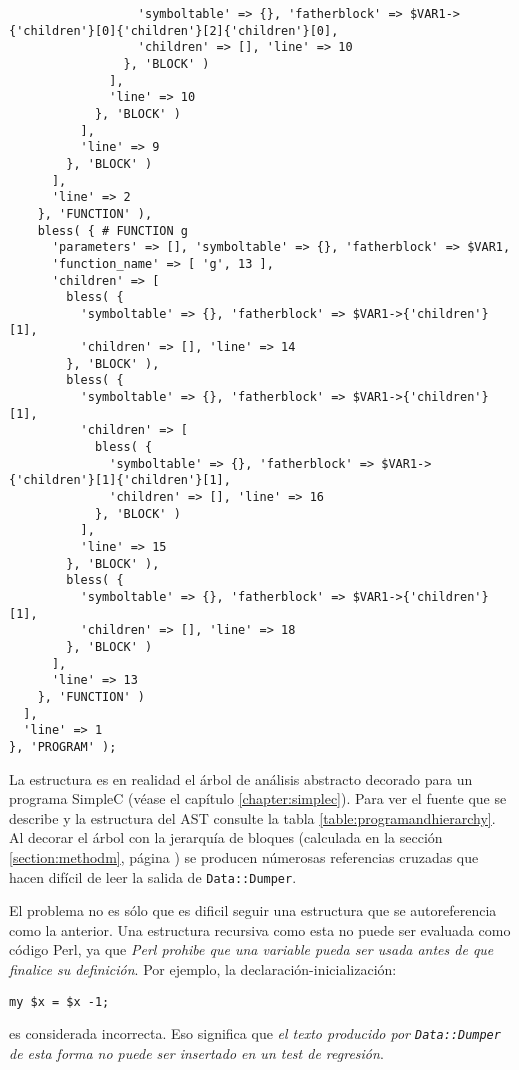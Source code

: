 \begin{verbatim}
                  'symboltable' => {}, 'fatherblock' => $VAR1->{'children'}[0]{'children'}[2]{'children'}[0],
                  'children' => [], 'line' => 10
                }, 'BLOCK' )
              ],
              'line' => 10
            }, 'BLOCK' )
          ],
          'line' => 9
        }, 'BLOCK' )
      ],
      'line' => 2
    }, 'FUNCTION' ),
    bless( { # FUNCTION g
      'parameters' => [], 'symboltable' => {}, 'fatherblock' => $VAR1,
      'function_name' => [ 'g', 13 ],
      'children' => [
        bless( {
          'symboltable' => {}, 'fatherblock' => $VAR1->{'children'}[1],
          'children' => [], 'line' => 14
        }, 'BLOCK' ),
        bless( {
          'symboltable' => {}, 'fatherblock' => $VAR1->{'children'}[1],
          'children' => [
            bless( {
              'symboltable' => {}, 'fatherblock' => $VAR1->{'children'}[1]{'children'}[1],
              'children' => [], 'line' => 16
            }, 'BLOCK' )
          ],
          'line' => 15
        }, 'BLOCK' ),
        bless( {
          'symboltable' => {}, 'fatherblock' => $VAR1->{'children'}[1],
          'children' => [], 'line' => 18
        }, 'BLOCK' )
      ],
      'line' => 13
    }, 'FUNCTION' )
  ],
  'line' => 1
}, 'PROGRAM' );
\end{verbatim}
La estructura es en realidad el árbol de análisis abstracto decorado
para un programa SimpleC
(véase el capítulo \ref{chapter:simplec}).
Para ver el fuente que se describe y la estructura del AST
consulte la tabla \ref{table:programandhierarchy}. Al decorar 
el árbol con la jerarquía de bloques (calculada en la sección
\ref{section:methodm}, página
\pageref{paragraph:jerarquiadebloquesconm})
se producen númerosas 
referencias cruzadas que hacen difícil de leer la salida de 
\verb|Data::Dumper|.


El problema no es sólo que es dificil seguir una estructura que se autoreferencia como 
la anterior.
Una estructura recursiva como esta no puede ser evaluada como código Perl, ya que 
\emph{Perl
prohibe que una variable pueda ser usada antes
de que finalice su definición}.
Por ejemplo, la declaración-inicialización:
\begin{verbatim}
my $x = $x -1;
\end{verbatim}
es considerada incorrecta. 
Eso significa que \emph{el texto producido por {\tt Data::Dumper} de esta forma
no puede ser insertado  en un test de regresión}.

